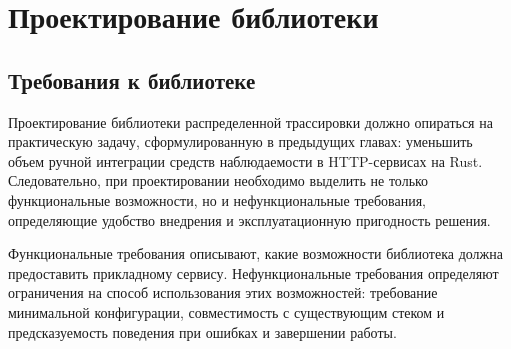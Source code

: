 \chapter{Проектирование библиотеки}
\label{chap:library-design}

\section{Требования к библиотеке}

Проектирование библиотеки распределенной трассировки должно опираться на
практическую задачу, сформулированную в предыдущих главах: уменьшить объем ручной
интеграции средств наблюдаемости в HTTP-сервисах на Rust. Следовательно, при
проектировании необходимо выделить не только функциональные возможности, но и
нефункциональные требования, определяющие удобство внедрения и эксплуатационную
пригодность решения.

Функциональные требования описывают, какие возможности библиотека должна
предоставить прикладному сервису. Нефункциональные требования определяют
ограничения на способ использования этих возможностей: требование минимальной
конфигурации, совместимость с существующим стеком и предсказуемость поведения при
ошибках и завершении работы.

